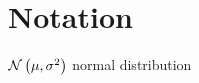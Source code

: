 \documentclass[../main.tex]{subfiles}
\begin{document}
\chapter*{Notation}

$\mathcal{N} \left(\mu, \sigma^2 \right)$ normal distribution
\end{document}
